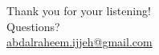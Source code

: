 \documentclass[10pt,aspectratio=169,dvipsnames]{beamer} %
\begin{document}
\setcounter{subfigure}{0}
{
	\begin{frame}[standout]
		\centering
		Thank you for your listening!\\ \vspace{12pt}
		Questions?\\ \vspace{12pt}
		\url{abdalraheem.ijjeh@gmail.com}
	\end{frame}
}
\note{}	
\end{document}
